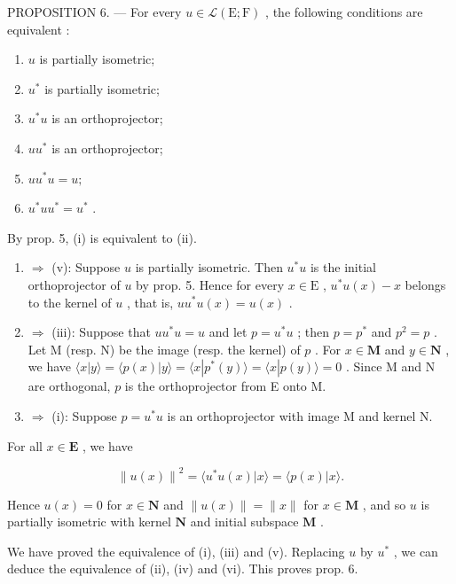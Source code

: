 PROPOSITION 6. --- For every \(u \in \mathcal{L}(\mathrm{E};\mathrm{F})\) , the following conditions are equivalent :

\begin{enumerate}
\def\labelenumi{(\roman{enumi})}
\item
  \(u\) is partially isometric;
\item
  \(u^{*}\) is partially isometric;
\item
  \(u^{*}u\) is an orthoprojector;
\item
  \(uu^{*}\) is an orthoprojector;
\item
  \(uu^{*}u = u;\)
\item
  \(u^{*}uu^{*} = u^{*}\) .
\end{enumerate}

By prop. 5, (i) is equivalent to (ii).

\begin{enumerate}
\def\labelenumi{(\roman{enumi})}
\item
  \(\Rightarrow\) (v): Suppose \(u\) is partially isometric. Then \(u^{*}u\) is the initial orthoprojector of \(u\) by prop. 5. Hence for every \(x \in \mathrm{E}\) , \(u^{*}u(x) - x\) belongs to the kernel of \(u\) , that is, \(uu^{*}u(x) = u(x)\) .
\item
  \(\Rightarrow\) (iii): Suppose that \(uu^{*}u = u\) and let \(p = u^{*}u\) ; then \(p = p^{*}\) and \(p^2 = p\) . Let M (resp. N) be the image (resp. the kernel) of \(p\) . For \(x \in \mathbf{M}\) and \(y \in \mathbf{N}\) , we have \(\langle x|y\rangle = \langle p(x)|y\rangle = \langle x|p^{*}(y)\rangle = \langle x|p(y)\rangle = 0\) . Since M and N are orthogonal, \(p\) is the orthoprojector from E onto M.
\item
  \(\Rightarrow\) (i): Suppose \(p = u^{*}u\) is an orthoprojector with image M and kernel N.
\end{enumerate}

For all \(x\in \mathbf{E}\) , we have

\[
\left\| u (x) \right\| ^ {2} = \langle u ^ {*} u (x) | x \rangle = \langle p (x) | x \rangle .
\]

Hence \(u(x) = 0\) for \(x \in \mathbf{N}\) and \(\| u(x) \| = \| x \|\) for \(x \in \mathbf{M}\) , and so \(u\) is partially isometric with kernel \(\mathbf{N}\) and initial subspace \(\mathbf{M}\) .

We have proved the equivalence of (i), (iii) and (v). Replacing \(u\) by \(u^*\) , we can deduce the equivalence of (ii), (iv) and (vi). This proves prop. 6.
\relax{}
